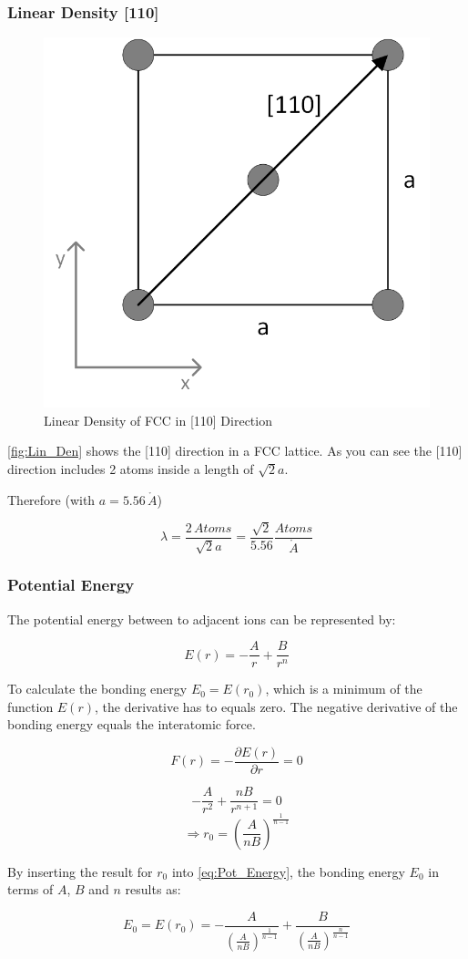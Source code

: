 \subsubsection*{Linear Density [110]}

\begin{figure}[H]
	\centering
	\includegraphics[width=0.5\linewidth]{Graphics/Chapter1/Lin_Den}
	\caption{Linear Density of FCC in [110] Direction}
	\label{fig:Lin_Den}
\end{figure}

\autoref{fig:Lin_Den} shows the [110] direction in a FCC lattice.
As you can see the [110] direction includes 2 atoms inside a 
length of $\sqrt{2}a$.

Therefore  (with $a = 5.56 \, \mathring{A}$)

$$\lambda = \frac{2 \, Atoms}{\sqrt{2}a} = \frac{\sqrt{2}}{5.56} \frac{Atoms}{\mathring{A}}$$

\subsubsection*{Potential Energy}

The potential energy between to adjacent ions can be represented by:

\begin{equation}
	E(r) = - \frac{A}{r} + \frac{B}{r^n}
	\label{eq:Pot_Energy}
\end{equation}


To calculate the bonding energy $E_0 = E(r_0)$, which is a minimum of the function $E(r)$,
the derivative has to equals zero.
The negative derivative of the bonding energy equals the interatomic force.

$$F(r) = - \frac{\partial E(r)}{\partial r} = 0$$

$$-\frac{A}{r^2} + \frac{nB}{r^{n+1}} = 0$$
$$\Rightarrow r_0 = \left( \frac{A}{nB} \right)^{\frac{1}{n-1}}$$

By inserting the result for $r_0$ into \autoref{eq:Pot_Energy}, the bonding energy $E_0$ in terms of $A$, $B$ and $n$ results as:

$$E_0 = E(r_0) = - \frac{A}{\left( \frac{A}{nB} \right)^{\frac{1}{n-1}}} + 
				\frac{B}{\left( \frac{A}{nB} \right)^{\frac{n}{n-1}}}$$

